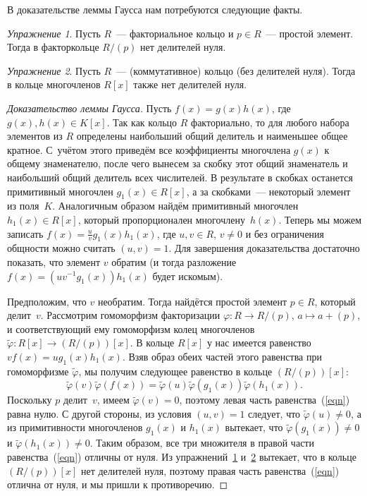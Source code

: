 \documentclass[a4paper, 12pt]{article}
\theoremstyle{definition}
\theoremstyle{remark}
\newtheorem{exercise}{Упражнение}
\begin{document}
В доказательстве леммы Гаусса нам потребуются следующие факты.

\begin{exercise} \label{ex_1}
Пусть $R$~--- факториальное кольцо и $p \in R$~--- простой элемент.
Тогда в факторкольце $R/(p)$ нет делителей нуля.
\end{exercise}

\begin{exercise} \label{ex_2}
Пусть $R$~--- (коммутативное) кольцо (без делителей нуля). Тогда в
кольце многочленов $R[x]$ также нет делителей нуля.
\end{exercise}

\begin{proof}[Доказательство леммы Гаусса]
Пусть $f(x) = g(x)h(x)$, где $g(x), h(x)\in K[x]$. Так как кольцо
$R$ факториально, то для любого набора элементов из $R$ определены
наибольший общий делитель и наименьшее общее кратное. С~учётом этого
приведём все коэффициенты многочлена $g(x)$ к общему знаменателю,
после чего вынесем за скобку этот общий знаменатель и наибольший
общий делитель всех числителей. В результате в скобках останется
примитивный многочлен $g_1(x) \in R[x]$, а за скобками~--- некоторый
элемент из поля~$K$. Аналогичным образом найдём примитивный
многочлен $h_1(x) \in R[x]$, который пропорционален
многочлену~$h(x)$. Теперь мы можем записать $f(x)=\frac{u}{v}g_1(x)
h_1(x)$, где $u,v \in R$, $v \ne 0$ и без ограничения общности можно
считать $(u,v)=1$. Для завершения доказательства достаточно
показать, что элемент $v$ обратим (и тогда разложение $f(x) =
(uv^{-1}g_1(x))h_1(x)$ будет искомым).

Предположим, что $v$ необратим. Тогда найдётся простой элемент $p
\in R$, который делит~$v$. Рассмотрим гомоморфизм факторизации
$\varphi \colon R \to R/(p)$, $a \mapsto a + (p)$, и соответствующий
ему гомоморфизм колец многочленов $\widetilde \varphi \colon R[x]
\to (R/(p))[x]$. В кольце $R[x]$ у нас имеется равенство $vf(x) =
ug_1(x)h_1(x)$. Взяв образ обеих частей этого равенства при
гомоморфизме $\widetilde \varphi$, мы получим следующее равенство в
кольце $(R / (p))[x]$:
\begin{equation} \label{eqn}
\widetilde \varphi(v) \widetilde \varphi(f(x)) = \widetilde
\varphi(u) \widetilde \varphi(g_1(x)) \widetilde \varphi(h_1(x)).
\end{equation}
Поскольку $p$ делит~$v$, имеем $\widetilde \varphi(v) = 0$, поэтому
левая часть равенства~(\ref{eqn}) равна нулю. С другой стороны, из
условия $(u,v) = 1$ следует, что $\widetilde \varphi(u) \ne 0$, а из
примитивности многочленов $g_1(x)$ и $h_1(x)$ вытекает, что
$\widetilde \varphi(g_1(x)) \ne 0$ и $\widetilde \varphi(h_1(x)) \ne
0$. Таким образом, все три множителя в правой части
равенства~(\ref{eqn}) отличны от нуля. Из упражнений~\ref{ex_1}
и~\ref{ex_2} вытекает, что в кольце $(R / (p))[x]$ нет делителей
нуля, поэтому правая часть равенства~(\ref{eqn}) отлична от нуля, и
мы пришли к противоречию.
\end{proof}
\end{document}

